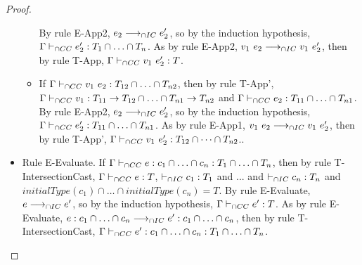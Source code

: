 \documentclass[a4paper]{article}
\begin{document}
\begin{proof}
\begin{itemize}
\begin{itemize}
        By rule E-App2, $e_2 \longrightarrow_{\cap IC} e_2'$, so by the induction hypothesis, $\Gamma \vdash_{\cap CC} e_2' : T_1 \cap \ldots \cap T_n$.
        As by rule E-App2, $v_1\ e_2 \longrightarrow_{\cap IC} v_1\ e_2'$, then by rule T-App, $\Gamma \vdash_{\cap CC} v_1\ e_2' : T$.
        \item If $\Gamma \vdash_{\cap CC} v_1\ e_2 : T_{12} \cap \ldots \cap T_{n2}$, then by rule T-App', $\Gamma \vdash_{\cap CC} v_1 : T_{11} \rightarrow T_{12} \cap \ldots \cap T_{n1} \rightarrow T_{n2}$ and $\Gamma \vdash_{\cap CC} e_2 : T_{11} \cap \ldots \cap T_{n1}$.
        By rule E-App2, $e_2 \longrightarrow_{\cap IC} e_2'$, so by the induction hypothesis, $\Gamma \vdash_{\cap CC} e_2' : T_{11} \cap \ldots \cap T_{n1}$.
        As by rule E-App1, $v_1\ e_2 \longrightarrow_{\cap IC} v_1\ e_2'$, then by rule T-App', $\Gamma \vdash_{\cap CC} v_1\ e_2' : T_{12} \cap \dots \cap T_{n2}$..
    \end{itemize}
    \item Rule E-Evaluate. If $\Gamma \vdash_{\cap CC} e : c_1 \cap \ldots \cap c_n : T_1 \cap \ldots \cap T_n$, then by rule T-IntersectionCast, $\Gamma \vdash_{\cap CC} e : T$, $\vdash_{\cap IC} c_1 : T_1$ and ... and $\vdash_{\cap IC} c_n : T_n$ and $initialType(c_1) \cap \ldots \cap initialType(c_n) = T$.
    By rule E-Evaluate, $e \longrightarrow_{\cap IC} e'$, so by the induction hypothesis, $\Gamma \vdash_{\cap CC} e' : T$.
    As by rule E-Evaluate, $e : c_1 \cap \ldots \cap c_n \longrightarrow_{\cap IC} e' : c_1 \cap \ldots \cap c_n$, then by rule T-IntersectionCast, $\Gamma \vdash_{\cap CC} e' : c_1 \cap \ldots \cap c_n : T_1 \cap \ldots \cap T_n$.
\end{itemize}
\end{proof}
\end{document}
